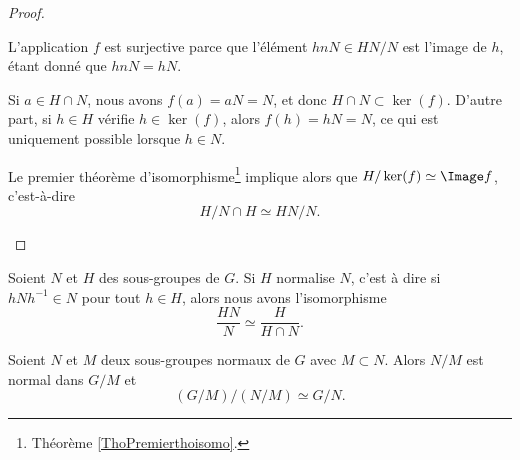 \begin{proof}
\begin{enumerate}
		      \begin{subproof}
			      L'application \( f\) est surjective parce que l'élément \( hnN\in HN/N\) est l'image de \( h\), étant donné que \( hnN=hN\).

			      \spitem[\( \ker(f) = H\cap N\)]
			      Si \( a\in H\cap N\), nous avons \( f(a) =aN = N\), et donc \( H\cap N\subset \ker(f)\). D'autre part, si \( h\in H\) vérifie \( h\in\ker(f)\), alors \( f(h)=hN=N\), ce qui est uniquement possible lorsque \( h\in N\).

		      \end{subproof}
		      Le premier théorème d'isomorphisme\footnote{Théorème \ref{ThoPremierthoisomo}.} implique alors que \( H/\ker(f)\simeq \Image f\), c'est-à-dire
		      \begin{equation}
			      H/N\cap H\simeq HN/N.
		      \end{equation}
	\end{enumerate}
\end{proof}

\begin{proposition}     \label{PROPooVBGMooPTlyLF}
	Soient \( N\) et \( H\) des sous-groupes de \( G\). Si \( H\) normalise \( N\), c'est à dire si \( hNh^{-1}\in N\) pour tout \( h\in H\), alors nous avons l'isomorphisme
	\begin{equation}
		\frac{ HN }{ N }\simeq\frac{ H }{ H\cap N }.
	\end{equation}
\end{proposition}

\begin{theorem}  \label{ThoezgBep}
	Soient \( N\) et \( M\) deux sous-groupes normaux de \( G\) avec \( M\subset N\). Alors \( N/M\) est normal dans \( G/M\) et
	\begin{equation}
		(G/M)/(N/M)\simeq G/N.
	\end{equation}
\end{theorem}

